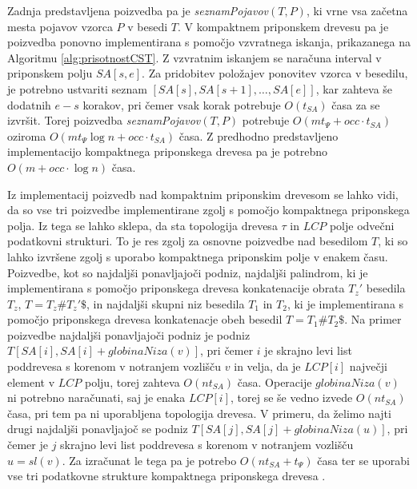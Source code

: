 Zadnja predstavljena poizvedba pa je \textit{seznamPojavov}$(T,P)$, ki vrne vsa začetna mesta pojavov vzorca $P$  v besedi $T$. V kompaktnem priponskem drevesu pa je poizvedba ponovno implementirana s pomočjo vzvratnega iskanja, prikazanega na Algoritmu \ref{alg:prisotnostCST}. Z vzvratnim iskanjem se naračuna interval v priponskem polju $SA[s,e]$. Za pridobitev položajev ponovitev vzorca v besedilu, je potrebno ustvariti seznam $[SA[s],SA[s+1],\dots,SA[e]]$, kar zahteva še dodatnih $e-s$ korakov, pri čemer vsak korak potrebuje $O(t_{SA})$ časa za se izvršit. Torej poizvedba \textit{seznamPojavov}$(T,P)$ potrebuje $O(mt_\Psi+occ\cdot t_{SA})$ oziroma $O(mt_\Psi \log{n}+occ\cdot t_{SA})$ časa. Z predhodno predstavljeno implementacijo kompaktnega priponskega drevesa pa je potrebno $O(m+occ\cdot\log{n})$ časa.

Iz implementacij poizvedb nad kompaktnim priponskim drevesom se lahko vidi, da so vse tri poizvedbe implementirane zgolj s pomočjo kompaktnega priponskega polja. Iz tega se lahko sklepa, da sta topologija drevesa $\tau$ in $LCP$ polje odvečni podatkovni strukturi. To je res zgolj za osnovne poizvedbe nad besedilom $T$, ki so lahko izvršene zgolj s uporabo kompaktnega priponskim polje v enakem času. Poizvedbe, kot so najdaljši ponavljajoči podniz, najdaljši palindrom, ki je implementirana s pomočjo priponskega drevesa konkatenacije obrata $T_z'$ besedila $T_z$, $T=T_{z}\#T_{z}'\$$, in najdaljši skupni niz besedila $T_1$ in $T_2$, ki je implementirana s pomočjo priponskega drevesa konkatenacje obeh besedil $T=T_1 \# T_2\$ $. Na primer poizvedbe najdaljši ponavljajoči podniz je podniz $T[SA[i],SA[i]+globinaNiza(v)]$, pri čemer $i$ je skrajno levi list poddrevesa s korenom v notranjem vozlišču $v$ in velja, da je $LCP[i]$ največji element v $LCP$ polju, torej zahteva $O(nt_{SA})$ časa. Operacije $globinaNiza(v)$ ni potrebno naračunati, saj je enaka $LCP[i]$, torej se še vedno izvede $O(nt_{SA})$ časa, pri tem pa ni uporabljena topologija drevesa. V primeru, da želimo najti drugi najdaljši ponavljajoč se podniz $T[SA[j],SA[j]+globinaNiza(u)]$, pri čemer je $j$ skrajno levi list poddrevesa s korenom v notranjem vozlišču $u=sl(v)$. Za izračunat le tega pa je potrebo $O(nt_{SA}+t_\Psi)$ časa ter se uporabi vse tri podatkovne strukture kompaktnega priponskega drevesa \cite{Valimaki2007, Weiner1973, Navarro2016}.